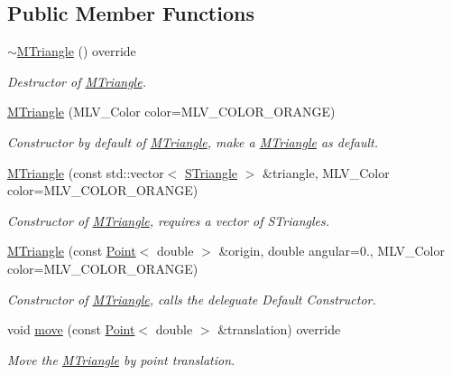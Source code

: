 \subsection*{Public Member Functions}
\begin{DoxyCompactItemize}
\item 
\mbox{\label{classMTriangle_aad494b73728c03ca00e728b0c505a88f}} 
\hyperlink{classMTriangle_aad494b73728c03ca00e728b0c505a88f}{$\sim$\+M\+Triangle} () override
\begin{DoxyCompactList}\small\item\em Destructor of \hyperlink{classMTriangle}{M\+Triangle}. \end{DoxyCompactList}\item 
\hyperlink{classMTriangle_aa3d177f785a15aee1416d5b0382b2f23}{M\+Triangle} (M\+L\+V\+\_\+\+Color color=M\+L\+V\+\_\+\+C\+O\+L\+O\+R\+\_\+\+O\+R\+A\+N\+GE)
\begin{DoxyCompactList}\small\item\em Constructor by default of \hyperlink{classMTriangle}{M\+Triangle}, make a \hyperlink{classMTriangle}{M\+Triangle} as default. \end{DoxyCompactList}\item 
\hyperlink{classMTriangle_ab611bdde6afe8f0ab0b3308d36b2416c}{M\+Triangle} (const std\+::vector$<$ \hyperlink{classSTriangle}{S\+Triangle} $>$ \&triangle, M\+L\+V\+\_\+\+Color color=M\+L\+V\+\_\+\+C\+O\+L\+O\+R\+\_\+\+O\+R\+A\+N\+GE)
\begin{DoxyCompactList}\small\item\em Constructor of \hyperlink{classMTriangle}{M\+Triangle}, requires a vector of S\+Triangles. \end{DoxyCompactList}\item 
\hyperlink{classMTriangle_a3c0ffb582fd22a3a673ec13e6575da28}{M\+Triangle} (const \hyperlink{classPoint}{Point}$<$ double $>$ \&origin, double angular=0., M\+L\+V\+\_\+\+Color color=M\+L\+V\+\_\+\+C\+O\+L\+O\+R\+\_\+\+O\+R\+A\+N\+GE)
\begin{DoxyCompactList}\small\item\em Constructor of \hyperlink{classMTriangle}{M\+Triangle}, calls the deleguate Default Constructor. \end{DoxyCompactList}\item 
void \hyperlink{classMTriangle_aa21f0514a8af2beba5ecf2ea5a22a4ef}{move} (const \hyperlink{classPoint}{Point}$<$ double $>$ \&translation) override
\begin{DoxyCompactList}\small\item\em Move the \hyperlink{classMTriangle}{M\+Triangle} by point translation. \end{DoxyCompactList}\item 

\end{DoxyCompactItemize}
